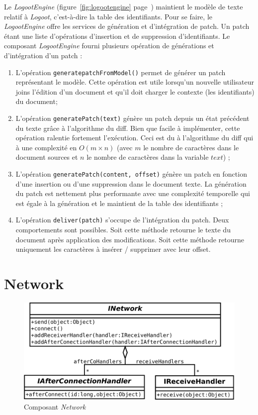   Le \emph{LogootEngine} (figure~\ref{fig:logootengine}
  page~\pageref{fig:logootengine}) maintient le modèle de texte relatif
  à \emph{Logoot}, c'est-à-dire la table des identifiants. Pour se faire, le
  \emph{LogootEngine} offre les services de génération et d'intégration de
  patch. Un patch étant une liste d'opérations d'insertion et de suppression
  d'identifiants. Le composant \emph{LogootEngine} fourni plusieurs opération
  de générations et d'intégration d'un patch : 
  \begin{enumerate}
    \item L'opération \verb?generatepatchFromModel()? permet de générer un patch
    représentant le modèle. Cette opération est utile lorsqu'un nouvelle
    utilisateur joins l'édition d'un document et qu'il doit charger le
    contexte (les identifiants) du document;
    \item L'opération \verb?generatePatch(text)? génère un patch
    depuis un état précédent du texte grâce à l'algorithme du diff. Bien que
    facile à implémenter, cette opération ralentie fortement l'exécution. Ceci
    est du à l'algorithme du diff qui à une complexité en
    $O(m \times n)$ (avec $m$ le nombre de caractères dans le document sources
    et $n$ le nombre de caractères dans la variable $text$) ;
    \item L'opération \verb?generatePatch(content, offset)? génère un
    patch en fonction d'une insertion ou d'une suppression dans le document
    texte. La génération du patch est nettement plus performante avec une
    complexité temporelle qui est égale à la génération et le maintient de la
    table des identifiants ;
    \item L'opération \verb?deliver(patch)? s'occupe de l'intégration du patch.
    Deux comportements sont possibles. Soit cette méthode retourne le texte
    du document après application des modifications. Soit cette
    méthode retourne uniquement les caractères à insérer / supprimer avec
    leur offset.
  \end{enumerate}

  \section{Network}
  \begin{figure}[hbt]
    \center
    \includegraphics[width=.7\textwidth]{includes/model/INetwork.pdf}
    \caption{Composant \emph{Network}}
    \label{fig:network}
  \end{figure}


